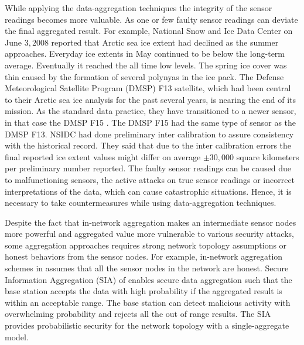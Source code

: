 	While applying the data-aggregation techniques the integrity of the sensor readings becomes more valuable.
	As one or few faulty sensor readings can deviate the final aggregated result.
	For example,
	National Snow and Ice Data Center on June $3, 2008$ \cite{nsidc} reported that Arctic sea ice extent had declined as the summer approaches. 
	Everyday ice extents in May continued to be below the long-term average.
	Eventually it reached the all time low levels.
	The spring ice cover was thin caused by the formation of several polynyas in the ice pack.
	The Defense Meteorological Satellite Program (DMSP) F13 \cite{dmsp-f13} satellite, which had been central to their Arctic sea ice analysis for the past several years, is nearing the end of its mission.
	As the standard data practice, they have transitioned to a newer sensor, in that case the DMSP F15 \cite{dmsp-f15}. 
	The DMSP F15 had the same type of sensor as the DMSP F13. 
	NSIDC had done preliminary inter calibration to assure consistency with the historical record. 
	They said that due to the inter calibration errors the final reported ice extent values might differ on average $\pm 30,000$ square kilometers per preliminary number reported.
	The faulty sensor readings can be caused due to malfunctioning sensors, the active attacks on true sensor readings or incorrect interpretations of the data, which can cause catastrophic situations.
	Hence, it is necessary to take countermeasures while using data-aggregation techniques.

	Despite the fact that in-network aggregation makes an intermediate sensor nodes more powerful and aggregated value more vulnerable to various security attacks, some aggregation approaches requires strong network topology assumptions or honest behaviors from the sensor nodes.
	For example, in-network aggregation schemes in \cite{yao2002cougar, madden2003design} assumes that all the sensor nodes in the network are honest. 
	Secure Information Aggregation (SIA) of \cite{przydatek2003sia} enables secure data aggregation such that the base station accepts the data with high probability if the aggregated result is within an acceptable range.
	The base station can detect malicious activity with overwhelming probability and rejects all the out of range results.
	The SIA provides probabilistic security for the network topology with a single-aggregate model.

